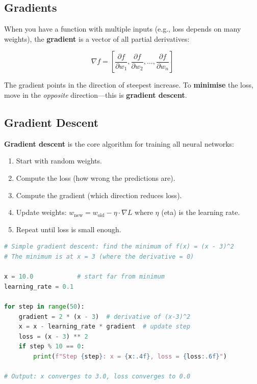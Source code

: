 \documentclass[12pt, a4paper, oneside]{book}
\begin{document}
\subsection{Gradients}

When you have a function with multiple inputs (e.g., loss depends on many weights), the \textbf{gradient} is a vector of all partial derivatives:

$$\nabla f = \left[\frac{\partial f}{\partial w_1}, \frac{\partial f}{\partial w_2}, \ldots, \frac{\partial f}{\partial w_n}\right]$$

The gradient points in the direction of steepest increase. To \textbf{minimise} the loss, move in the \emph{opposite} direction---this is \textbf{gradient descent}.

\subsection{Gradient Descent}

\textbf{Gradient descent} is the core algorithm for training all neural networks:

\begin{enumerate}[leftmargin=2em]
    \item Start with random weights.
    \item Compute the loss (how wrong the predictions are).
    \item Compute the gradient (which direction reduces loss).
    \item Update weights: $w_{\text{new}} = w_{\text{old}} - \eta \cdot \nabla L$ where $\eta$ (eta) is the learning rate.
    \item Repeat until loss is small enough.
\end{enumerate}

\begin{lstlisting}[language=Python, caption={Gradient descent from scratch}]
# Simple gradient descent: find the minimum of f(x) = (x - 3)^2
# The minimum is at x = 3 (where the derivative = 0)

x = 10.0            # start far from minimum
learning_rate = 0.1

for step in range(50):
    gradient = 2 * (x - 3)  # derivative of (x-3)^2
    x = x - learning_rate * gradient  # update step
    loss = (x - 3) ** 2
    if step % 10 == 0:
        print(f"Step {step}: x = {x:.4f}, loss = {loss:.6f}")

# Output: x converges to 3.0, loss converges to 0.0
\end{lstlisting}
\end{document}
